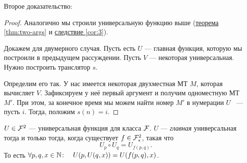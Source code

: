 \noindent 
Второе доказательство:
\begin{proof}
	Аналогично мы строили универсальную функцию выше (\hyperref[thm:two-args]{теорема \ref{thm:two-args}} и \hyperref[cor:3]{следствие \ref{cor:3}}). 

	Докажем для двумерного случая. Пусть есть $U$ --- главная функция, которую мы построили в предыдущем рассуждении. Пусть $V$ --- некоторая универсальная. Нужно построить транслятор $s$. \par \par Определим его так. У нас имеется некоторая двухместная МТ $M$, которая вычисляет $V$. Зафиксируем у неё первый аргумент и получим одноместную МТ $M'$. При этом, за конечное время мы можем найти номер $M'$ в нумерации $U$ ~--- пусть $i$. Тогда, положим $s(n) = i$. 
\end{proof}


\begin{thm}
	$ U \in \mathcal{F}^2 $ --- универсальная функция для класса $ \mathcal{F}$. $ U$ --- \textit{главная} универсальная тогда и только тогда, когда существует $ f \in \mathcal{F}^2_{*}$, такая что
	\[
		U_p \circ U_q = U_{f(p, q)}
	.\] 
	То есть $ \forall p, q, x \in \mathbb{N} \colon \quad U(p, U(q, x)) = U(f(p, q), x)$.
\end{thm}

